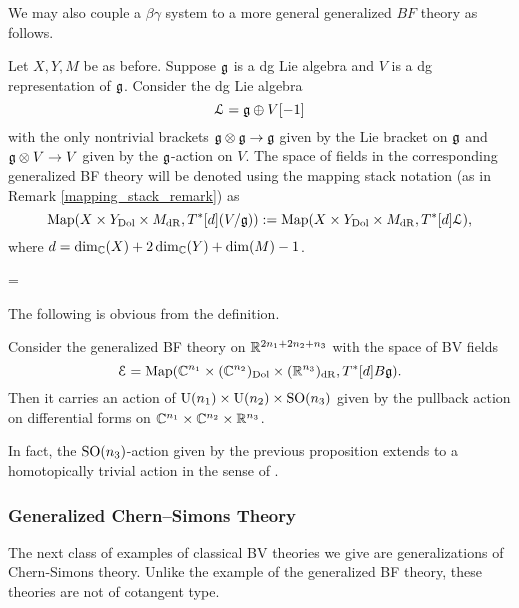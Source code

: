 \documentclass[10pt, oneside]{article}
\renewcommand{\U}{\mathrm{U}}
\begin{document}
We may also couple a $\beta\gamma$ system to a more general generalized $BF$ theory as follows.

\begin{example}
Let $X,Y,M$ be as before. Suppose $\mathfrak g$ is a dg Lie algebra and $V$ is a dg representation of $\mathfrak g$. Consider the dg Lie algebra
\[\mathcal L = \mathfrak g\oplus V[-1]\]
with the only nontrivial brackets $\mathfrak g\otimes \mathfrak g\rightarrow \mathfrak g$ given by the Lie bracket on $\mathfrak g$ and $\mathfrak g\otimes V\rightarrow V$ given by the $\mathfrak g$-action on $V$. The space of fields in the corresponding generalized BF theory will be denoted using the mapping stack notation (as in Remark \ref{mapping_stack_remark}) as
\[\operatorname{Map}(X\times Y_{\mathrm{Dol}}\times M_{\mathrm{dR}}, T^*[d] (V / \mathfrak g)):=\operatorname{Map}(X\times Y_{\mathrm{Dol}}\times M_{\mathrm{dR}}, T^*[d] \mathcal L),\]
where $d = \dim_\mathbb C(X) + 2\dim_\mathbb C(Y) + \dim(M) - 1$.
\end{example}=

The following is obvious from the definition.

\begin{prop}
Consider the generalized BF theory on $\mathbb R^{2n_1+2n_2+n_3}$ with the space of BV fields
\[\mathcal E = \operatorname{Map}(\mathbb C^{n_1}\times (\mathbb C^{n_2})_{\mathrm{Dol}}\times (\mathbb R^{n_3})_{\mathrm{dR}}, T^*[d] B\mathfrak g).\]
Then it carries an action of $\U(n_1)\times \U(n_2)\times \SO(n_3)$ given by the pullback action on differential forms on $\mathbb C^{n_1}\times \mathbb C^{n_2}\times \mathbb R^{n_3}$.
\label{prop:BFrotationaction}
\end{prop}

\begin{remark}
In fact, the $\mathrm{SO}(n_3)$-action given by the previous proposition extends to a homotopically trivial action in the sense of \cite[Section 2.4]{ElliottSafronov}.
\end{remark}

\subsubsection{Generalized Chern--Simons Theory} \label{gen_CS_section}
The next class of examples of classical BV theories we give are generalizations of Chern-Simons theory. Unlike the example of the generalized BF theory, these theories are not of cotangent type.
\end{document}
